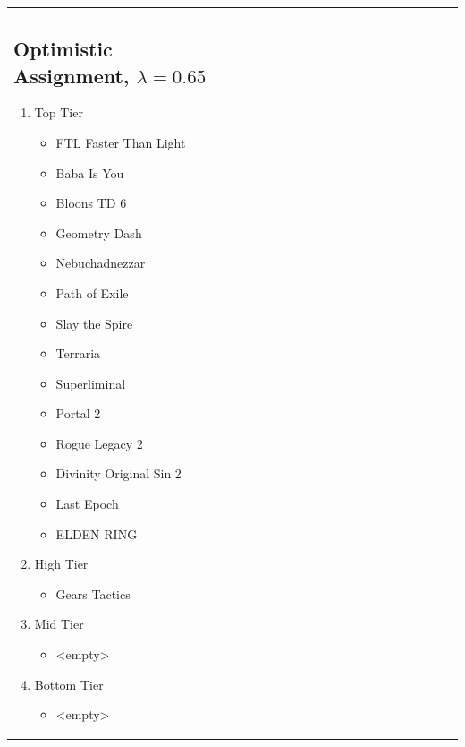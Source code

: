 \documentclass{article}
\begin{document}
\begin{enumerate}
\begin{tabular}{m{0.5\linewidth}m{0.5\linewidth}}
        \subsection*{Optimistic Assignment, $\lambda = 0.65$}
        \begin{enumerate}
            \item Top Tier
                \begin{itemize}
                    \item FTL Faster Than Light
                    \item Baba Is You
                    \item Bloons TD 6
                    \item Geometry Dash
                    \item Nebuchadnezzar
                    \item Path of Exile
                    \item Slay the Spire
                    \item Terraria
                    \item Superliminal
                    \item Portal 2
                    \item Rogue Legacy 2
                    \item Divinity Original Sin 2
                    \item Last Epoch
                    \item ELDEN RING
                \end{itemize}
            \item High Tier
                \begin{itemize}
                    \item Gears Tactics
                \end{itemize}
            \item Mid Tier
                \begin{itemize}
                    \item <empty>
                \end{itemize}
            \item Bottom Tier
                \begin{itemize}
                    \item <empty>
                \end{itemize}
        \end{enumerate}
    \end{tabular}




\end{enumerate}
\end{document}
